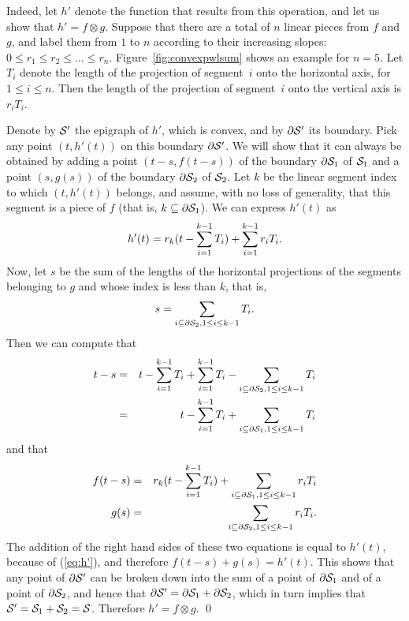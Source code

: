 Indeed, let $h'$ denote the function that results from this
operation, and let us show that $h' = f \otimes g$. Suppose that
there are a total of $n$ linear pieces from $f$ and $g$, and label
them from $1$ to $n$ according to their increasing slopes: $0 \leq
r_1 \leq r_2 \leq \ldots \leq r_n$. Figure~\ref{fig:convexpwlsum}
shows an example for $n=5$. Let $T_i$ denote the length of the
projection of segment~$i$ onto the horizontal axis, for $1 \leq i
\leq n$. Then the length of the projection of segment~$i$ onto the
vertical axis is $r_iT_i$.
\begin{figure}[!htbp]
\end{figure}
Denote by $\mathcal S '$ the epigraph of $h'$, which is convex, and by $ \partial \mathcal S '$ its boundary.
Pick any point $(t,h'(t))$ on this boundary $\partial \mathcal S '$. We will show that it
can always be obtained by adding a point $(t-s,f(t-s))$
of the boundary $ \partial \mathcal S_1$ of $\mathcal S_1$ and a point
$(s,g(s))$  of the boundary $ \partial \mathcal S_2$ of $\mathcal S_2$.
 Let $k$ be the linear segment index to which $(t,h'(t))$
belongs, and assume, with no loss of generality, that this segment is a piece of $f$
(that is, $k \subseteq  \partial \mathcal S_1$).
We can express $h'(t)$ as
\begin{equation}
\mylabel{eq:h'}
 h'(t) = r_k (t - \sum_{i=1}^{k-1}T_i ) + \sum_{i=1}^{k-1}r_iT_i.
\end{equation}
Now, let $s$ be the sum of the lengths of the horizontal projections of
the segments belonging to $g$ and whose index is less than $k$, that is,
$$ s = \sum_{  i \subseteq \partial \mathcal S_2, 1 \leq i \leq k-1} T_i. $$
Then we can compute that
\begin{eqnarray*}
 t- s & = & t - \sum_{i=1}^{k-1}T_i  + \sum_{i=1}^{k-1}T_i - \sum_{i \subseteq \partial \mathcal S_2, 1 \leq i \leq k-1} T_i \\
    & = & t - \sum_{i=1}^{k-1}T_i  + \sum_{i \subseteq \partial \mathcal S_1, 1 \leq i \leq k-1} T_i
\end{eqnarray*}
and that
\begin{eqnarray*}
f(t-s) & = & r_k(t - \sum_{i=1}^{k-1}T_i ) +  \sum_{ i \subseteq \partial \mathcal S_1, 1 \leq i \leq k-1} r_i T_i \\
 g(s) & = &  \sum_{i \subseteq \partial \mathcal S_2, 1 \leq i \leq k-1} r_iT_i.
\end{eqnarray*}
The addition of the right hand sides of these two equations is
equal to $h'(t)$, because of (\ref{eq:h'}), and therefore $f(t-s)
+ g(s) = h'(t)$. This shows that any point of $\partial \mathcal S'$
can be broken down into the sum of a point of $\partial \mathcal S_1$
and of a point of $\partial \mathcal S_2$, and hence that $\partial
\mathcal S'
=
\partial \mathcal S_1 + \partial \mathcal S_2$,  which in turn implies that
$\mathcal S' = \mathcal S_1 + \mathcal S_2 = \mathcal S$. Therefore $h'= f \otimes g$.
\qed

